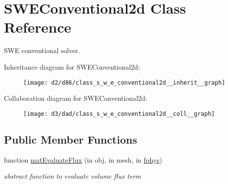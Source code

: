 \hypertarget{class_s_w_e_conventional2d}{}\section{S\+W\+E\+Conventional2d Class Reference}
\label{class_s_w_e_conventional2d}


S\+WE conventional solver.  




Inheritance diagram for S\+W\+E\+Conventional2d\+:
\nopagebreak
\begin{figure}[H]
\begin{center}
\leavevmode
\texttt{[image: d2/d86/class\_s\_w\_e\_conventional2d\_\_inherit\_\_graph]}
\end{center}
\end{figure}


Collaboration diagram for S\+W\+E\+Conventional2d\+:
\nopagebreak
\begin{figure}[H]
\begin{center}
\leavevmode
\texttt{[image: d3/dad/class\_s\_w\_e\_conventional2d\_\_coll\_\_graph]}
\end{center}
\end{figure}
\subsection*{Public Member Functions}
\begin{DoxyCompactItemize}
\item 
function \hyperlink{class_s_w_e_conventional2d_a45bdb5dd88ae1ea73f2d7a7dd40cdbb9}{mat\+Evaluate\+Flux} (in obj, in mesh, in \hyperlink{class_ndg_phys_a6b25724fc9474d32018439009072f0a9}{fphys})
\begin{DoxyCompactList}\small\item\em abstract function to evaluate volume flux term \end{DoxyCompactList}\end{DoxyCompactItemize}

